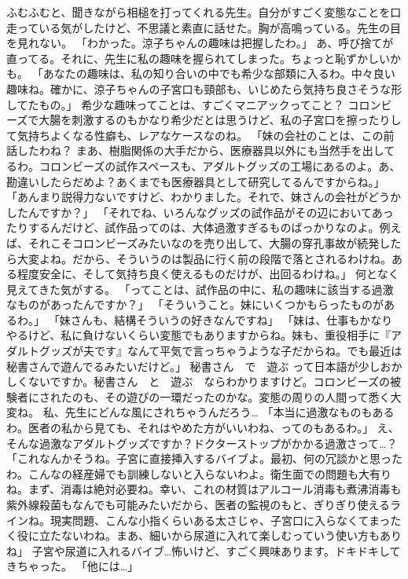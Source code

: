 ふむふむと、聞きながら相槌を打ってくれる先生。自分がすごく変態なことを口走っている気がしたけど、不思議と素直に話せた。胸が高鳴っている。先生の目を見れない。
「わかった。涼子ちゃんの趣味は把握したわ。」
あ、呼び捨てが直ってる。それに、先生に私の趣味を握られてしまった。ちょっと恥ずかしいかも。
「あなたの趣味は、私の知り合いの中でも希少な部類に入るわ。中々良い趣味ね。確かに、涼子ちゃんの子宮口も頸部も、いじめたら気持ち良さそうな形してたもの。」
希少な趣味ってことは、すごくマニアックってこと？ コロンビーズで大腸を刺激するのもかなり希少だとは思うけど、私の子宮口を擦ったりして気持ちよくなる性癖も、レアなケースなのね。
「妹の会社のことは、この前話したわね？ まあ、樹脂関係の大手だから、医療器具以外にも当然手を出してるわ。コロンビーズの試作スペースも、アダルトグッズの工場にあるのよ。あ、勘違いしたらだめよ？あくまでも医療器具として研究してるんですからね。」
「あんまり説得力ないですけど、わかりました。それで、妹さんの会社がどうかしたんですか？」
「それでね、いろんなグッズの試作品がその辺においてあったりするんだけど、試作品ってのは、大体過激すぎるものばっかりなのよ。例えば、それこそコロンビーズみたいなのを売り出して、大腸の穿孔事故が続発したら大変よね。だから、そういうのは製品に行く前の段階で落とされるわけね。ある程度安全に、そして気持ち良く使えるものだけが、出回るわけね。」
何となく見えてきた気がする。
「ってことは、試作品の中に、私の趣味に該当する過激なものがあったんですか？」
「そういうこと。妹にいくつかもらったものがあるわ。」
「妹さんも、結構そういうの好きなんですね」
「妹は、仕事もかなりやるけど、私に負けないくらい変態でもありますからね。妹も、重役相手に『アダルトグッズが夫です』なんて平気で言っちゃうような子だからね。でも最近は秘書さんで遊んでるみたいだけど。」
秘書さん　で　遊ぶ って日本語が少しおかしくないですか。秘書さん　と　遊ぶ　ならわかりますけど。コロンビーズの被験者にされたのも、その遊びの一環だったのかな。変態の周りの人間って悉く大変ね。
私、先生にどんな風にされちゃうんだろう…
「本当に過激なものもあるわ。医者の私から見ても、それはやめた方がいいわね、ってのもあるわ。」
え、そんな過激なアダルトグッズですか？ドクターストップがかかる過激さって…？
「これなんかそうね。子宮に直接挿入するバイブよ。最初、何の冗談かと思ったわ。こんなの経産婦でも訓練しないと入らないわよ。衛生面での問題も大有りね。まず、消毒は絶対必要ね。幸い、これの材質はアルコール消毒も煮沸消毒も紫外線殺菌もなんでも可能みたいだから、医者の監視のもと、ぎりぎり使えるラインね。現実問題、こんな小指くらいある太さじゃ、子宮口に入らなくてまったく役に立たないわね。まあ、細いから尿道に入れて楽しむっていう使い方もありね」
子宮や尿道に入れるバイブ…怖いけど、すごく興味あります。ドキドキしてきちゃった。
「他には…」
